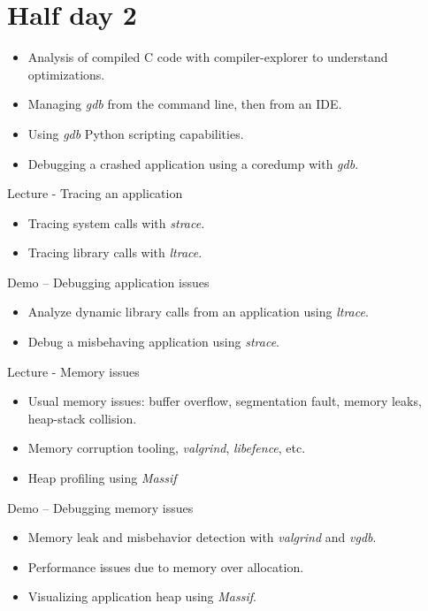 \documentclass[a4paper,12pt,obeyspaces,spaces,hyphens]{article}
\begin{document}
\section{Half day 2}

{
  \begin{itemize}
  \item Analysis of compiled C code with compiler-explorer to understand
    optimizations.
  \item Managing {\em gdb} from the command line, then from an IDE.
  \item Using {\em gdb} Python scripting capabilities.
  \item Debugging a crashed application using a coredump with {\em gdb}.
  \end{itemize}
}

\feagendatwocolumn
{Lecture - Tracing an application}
{
  \begin{itemize}
  \item Tracing system calls with {\em strace}.
  \item Tracing library calls with {\em ltrace}.
  \end{itemize}
}
{Demo – Debugging application issues}
{
  \begin{itemize}
  \item Analyze dynamic library calls from an application using
    {\em ltrace}.
  \item Debug a misbehaving application using {\em strace}.
  \end{itemize}
}

\feagendatwocolumn
{Lecture - Memory issues}
{
  \begin{itemize}
  \item Usual memory issues: buffer overflow, segmentation fault,
    memory leaks, heap-stack collision.
  \item Memory corruption tooling, {\em valgrind}, {\em libefence},
    etc.
  \item Heap profiling using {\em Massif}
  \end{itemize}
}
{Demo – Debugging memory issues}
{
  \begin{itemize}
  \item Memory leak and misbehavior detection with {\em valgrind} and
    {\em vgdb}.
  \item Performance issues due to memory over allocation.
  \item Visualizing application heap using {\em Massif}.
  \end{itemize}
}
\end{document}
